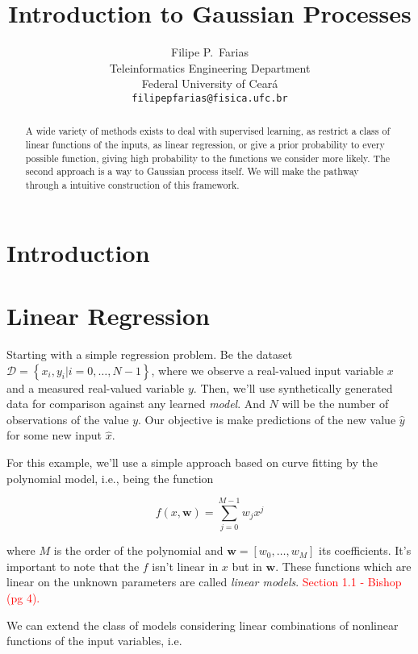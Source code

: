 \documentclass[11pt]{article} %
\title{Introduction to Gaussian Processes}
\author{
Filipe P.~Farias \\
Teleinformatics Engineering Department\\
Federal University of Ceará\\
\texttt{filipepfarias@fisica.ufc.br} \\
}
\begin{document}
\maketitle

\begin{abstract}
   A wide variety of methods exists to deal with supervised learning, as restrict a class of linear functions of the inputs, as linear regression, or give a prior probability to every possible function, giving high probability to the functions we consider more likely. The second approach is a way to Gaussian process itself. We will make the pathway through a intuitive construction of this framework.
\end{abstract}

\section{Introduction}

\lipsum[1]%

\section{Linear Regression}

Starting with a simple regression problem. Be the dataset $\mathcal{D}=\left\{ x_i,y_i|i=0,\dots,N-1 \right\}$, where we observe a real-valued input variable $x$ and a measured real-valued variable $y$. Then, we'll use synthetically generated data for comparison against any learned \textit{model}. And $N$ will be the number of observations of the value $y$. Our objective is make predictions of the new value $\hat{y}$ for some new input $\hat{x}$.

For this example, we'll use a simple approach based on curve fitting by the polynomial model, i.e., being the function

\begin{equation}
   f(x,\mathbf{w}) = \sum_{j=0}^{M-1} w_j x^j
\end{equation}

where $M$ is the order of the polynomial and $\mathbf{w}=\left[ w_0,\dots,w_M \right]$ its coefficients. It's important to note that the $f$ isn't linear in $x$ but in $\mathbf{w}$. These functions which are linear on the unknown parameters are called \textit{linear models}.
\textcolor{red}{Section 1.1 - Bishop (pg 4).}

We can extend the class of models considering linear combinations of nonlinear functions of the input variables, i.e.
\end{document}
